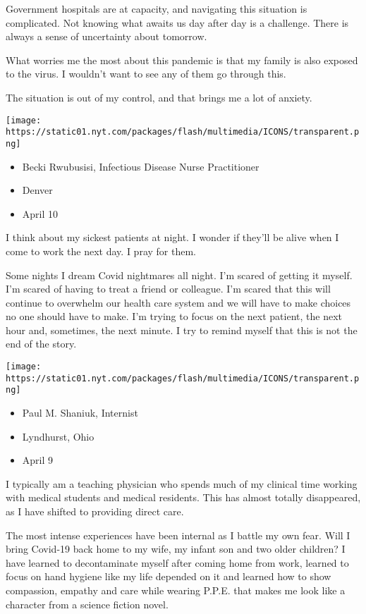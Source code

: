 Government hospitals are at capacity, and navigating this situation is
complicated. Not knowing what awaits us day after day is a challenge.
There is always a sense of uncertainty about tomorrow.

What worries me the most about this pandemic is that my family is also
exposed to the virus. I wouldn't want to see any of them go through
this.

The situation is out of my control, and that brings me a lot of anxiety.

\texttt{[image: https://static01.nyt.com/packages/flash/multimedia/ICONS/transparent.png]}

\begin{itemize}
\tightlist
\item
  Becki Rwubusisi, Infectious Disease Nurse Practitioner
\item
  Denver
\item
  April 10
\end{itemize}

I think about my sickest patients at night. I wonder if they'll be alive
when I come to work the next day. I pray for them.

Some nights I dream Covid nightmares all night. I'm scared of getting it
myself. I'm scared of having to treat a friend or colleague. I'm scared
that this will continue to overwhelm our health care system and we will
have to make choices no one should have to make. I'm trying to focus on
the next patient, the next hour and, sometimes, the next minute. I try
to remind myself that this is not the end of the story.

\texttt{[image: https://static01.nyt.com/packages/flash/multimedia/ICONS/transparent.png]}

\begin{itemize}
\tightlist
\item
  Paul M. Shaniuk, Internist
\item
  Lyndhurst, Ohio
\item
  April 9
\end{itemize}

I typically am a teaching physician who spends much of my clinical time
working with medical students and medical residents. This has almost
totally disappeared, as I have shifted to providing direct care.

The most intense experiences have been internal as I battle my own fear.
Will I bring Covid-19 back home to my wife, my infant son and two older
children? I have learned to decontaminate myself after coming home from
work, learned to focus on hand hygiene like my life depended on it and
learned how to show compassion, empathy and care while wearing P.P.E.
that makes me look like a character from a science fiction novel.


